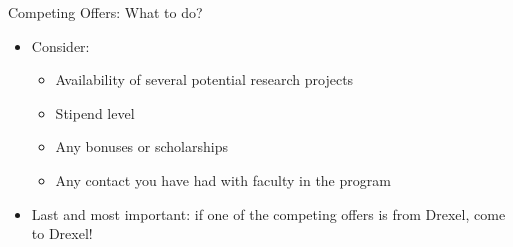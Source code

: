 \begin{frame}[fragile]{Competing Offers: What to do?}
\begin{itemize}
    \item Consider:
    \begin{itemize}
        \item Availability of several potential research projects
        \item Stipend level
        \item Any bonuses or scholarships
        \item Any contact you have had with faculty in the program
    \end{itemize}
    \item Last and most important: if one of the competing offers is from Drexel, come to Drexel!
\end{itemize}
\end{frame}

